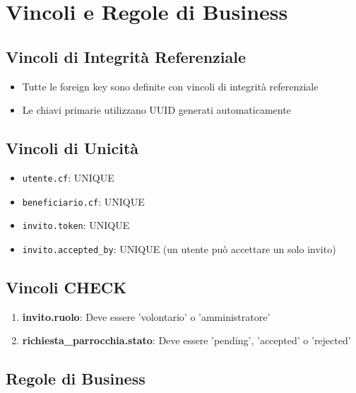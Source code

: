 \documentclass[11pt,a4paper]{article}
\begin{document}
\section{Vincoli e Regole di Business}

\subsection{Vincoli di Integrità Referenziale}

\begin{itemize}
\item Tutte le foreign key sono definite con vincoli di integrità referenziale
\item Le chiavi primarie utilizzano UUID generati automaticamente
\end{itemize}

\subsection{Vincoli di Unicità}

\begin{itemize}
\item \texttt{utente.cf}: UNIQUE
\item \texttt{beneficiario.cf}: UNIQUE
\item \texttt{invito.token}: UNIQUE
\item \texttt{invito.accepted\_by}: UNIQUE (un utente può accettare un solo invito)
\end{itemize}

\subsection{Vincoli CHECK}

\begin{enumerate}
\item \textbf{invito.ruolo}: Deve essere 'volontario' o 'amministratore'
\item \textbf{richiesta\_parrocchia.stato}: Deve essere 'pending', 'accepted' o 'rejected'
\end{enumerate}

\subsection{Regole di Business}
\end{document}
